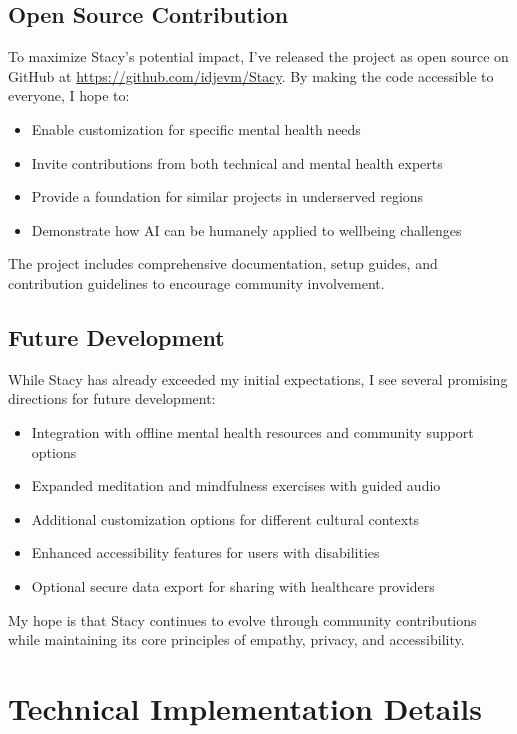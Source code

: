 \documentclass[12pt]{article}
\begin{document}
\subsection{Open Source Contribution}

To maximize Stacy's potential impact, I've released the project as open source on GitHub at \url{https://github.com/idjevm/Stacy}. By making the code accessible to everyone, I hope to:

\begin{itemize}
    \item Enable customization for specific mental health needs
    \item Invite contributions from both technical and mental health experts
    \item Provide a foundation for similar projects in underserved regions
    \item Demonstrate how AI can be humanely applied to wellbeing challenges
\end{itemize}

The project includes comprehensive documentation, setup guides, and contribution guidelines to encourage community involvement.

\subsection{Future Development}

While Stacy has already exceeded my initial expectations, I see several promising directions for future development:

\begin{itemize}
    \item Integration with offline mental health resources and community support options
    \item Expanded meditation and mindfulness exercises with guided audio
    \item Additional customization options for different cultural contexts
    \item Enhanced accessibility features for users with disabilities
    \item Optional secure data export for sharing with healthcare providers
\end{itemize}

My hope is that Stacy continues to evolve through community contributions while maintaining its core principles of empathy, privacy, and accessibility.

\section{Technical Implementation Details}
\end{document}
